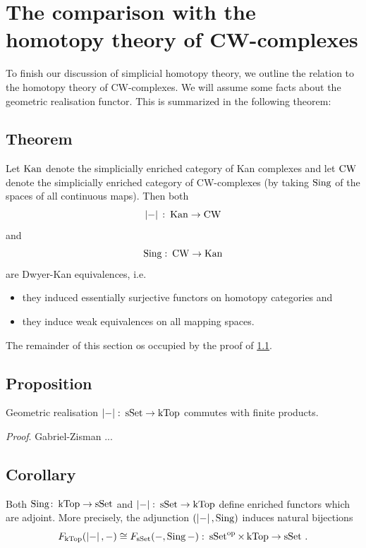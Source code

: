 \section{The comparison with the homotopy theory of CW-complexes}\label{chV-5}
    To finish our discussion of simplicial homotopy theory, we outline the relation to the homotopy theory of CW-complexes. We will assume some facts about the geometric realisation functor. This is summarized in the following theorem:

    \subsection{Theorem}\label{chV-5-1}
        Let $\operatorname{Kan}$ denote the simplicially enriched category of Kan complexes and let $\operatorname{CW}$ denote the simplicially enriched category of CW-complexes (by taking $\operatorname{Sing}$ of the spaces of all continuous maps). Then both
        \begin{equation*}
            \left| - \right| \,\colon \operatorname{Kan} \to \operatorname{CW}
        \end{equation*}
        and
        \begin{equation*}
            \operatorname{Sing} \,\colon \operatorname{CW} \to \operatorname{Kan}
        \end{equation*}
        are Dwyer-Kan equivalences, i.e.
        \begin{itemize}
            \item 
                they induced essentially surjective functors on homotopy categories and
            \item 
                they induce weak equivalences on all mapping spaces.
        \end{itemize}
        \medskip

        The remainder of this section os occupied by the proof of \ref{chV-5-1}.

    \subsection{Proposition}\label{chV-5-2}
        Geometric realisation $\left| - \right| \colon \operatorname{sSet} \to \operatorname{kTop}$ commutes with finite products.
        \smallskip

        \emph{Proof}. Gabriel-Zisman ...

    \subsection{Corollary}\label{chV-5-3}
        Both $\operatorname{Sing} \colon \operatorname{kTop} \to \operatorname{sSet}$ and $\left| - \right| \colon \operatorname{sSet} \to \operatorname{kTop}$ define enriched functors which are adjoint. More precisely, the adjunction $(\left| - \right|, \operatorname{Sing})$ induces natural bijections
        \begin{equation*}
            F_{\operatorname{kTop}}(\left| - \right|, -) \cong F_{\operatorname{sSet}}(-, \operatorname{Sing} -) \,\colon \operatorname{sSet}^{\operatorname{op}} \times \operatorname{kTop} \to \operatorname{sSet} \,.
        \end{equation*}
        \smallskip

